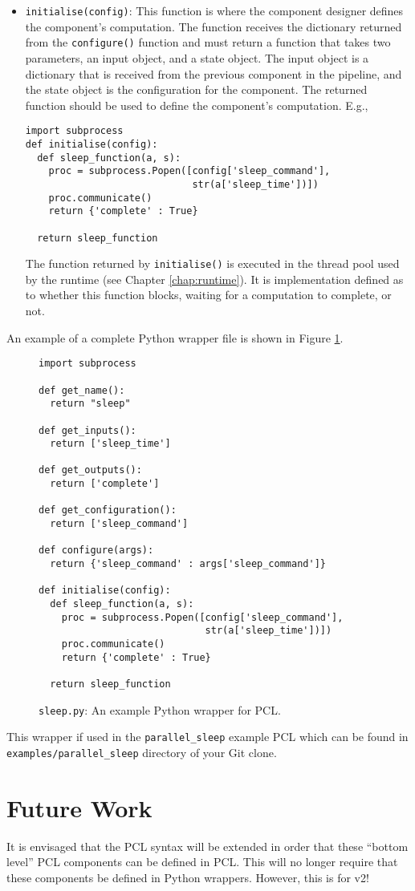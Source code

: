 \begin{itemize}
\item \texttt{initialise(config)}: This function is where the component designer defines the component's computation. The function receives the dictionary returned from the \texttt{configure()} function and must return a function that takes two parameters, an input object, and a state object. The input object is a dictionary that is received from the previous component in the pipeline, and the state object is the configuration for the component. The returned function should be used to define the component's computation. E.g.,
\begin{verbatim}
import subprocess
def initialise(config):
  def sleep_function(a, s):
    proc = subprocess.Popen([config['sleep_command'],
                             str(a['sleep_time'])])
    proc.communicate()
    return {'complete' : True}

  return sleep_function
\end{verbatim}
The function returned by \texttt{initialise()} is executed in the thread pool used by the runtime (see Chapter \ref{chap:runtime}). It is implementation defined as to whether this function blocks, waiting for a computation to complete, or not.
\end{itemize}

An example of a complete Python wrapper file is shown in Figure \ref{fig:python-wrapper}.
\begin{figure}[h!]
\begin{verbatim}
import subprocess

def get_name():
  return "sleep"

def get_inputs():
  return ['sleep_time']

def get_outputs():
  return ['complete']

def get_configuration():
  return ['sleep_command']

def configure(args):
  return {'sleep_command' : args['sleep_command']}

def initialise(config):
  def sleep_function(a, s):
    proc = subprocess.Popen([config['sleep_command'],
                             str(a['sleep_time'])])
    proc.communicate()
    return {'complete' : True}

  return sleep_function
\end{verbatim}
\caption{\texttt{sleep.py}: An example Python wrapper for PCL.}
\label{fig:python-wrapper}
\end{figure}
This wrapper if used in the \texttt{parallel\_sleep} example PCL which can be found in \texttt{examples/parallel\_sleep} directory of your Git clone.

\section{Future Work}
It is envisaged that the PCL syntax will be extended in order that these ``bottom level'' PCL components can be defined in PCL. This will no longer require that these components be defined in Python wrappers. However, this is for v2!